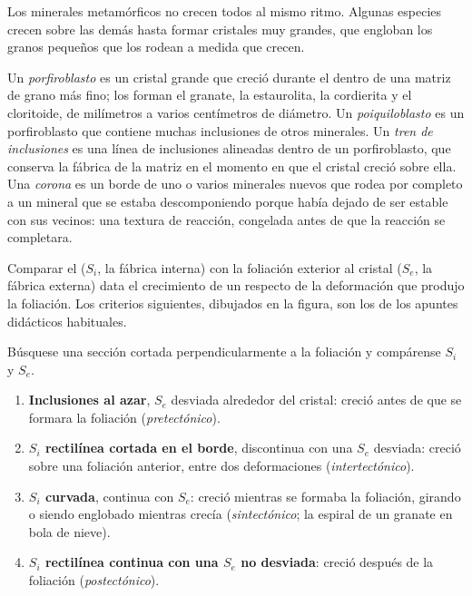 Los minerales metamórficos no crecen todos al mismo ritmo. Algunas especies crecen sobre las demás hasta formar cristales muy grandes,
que engloban los granos pequeños que los rodean a medida que crecen.

\begin{definition}\label{def:b2:field-lab-methods-2:porphyroblast}
Un \emph{porfiroblasto} es un cristal grande que creció durante el 
dentro de una matriz de grano más fino; los forman el granate, la estaurolita, la cordierita y el cloritoide, de
milímetros a varios centímetros de diámetro. Un \emph{poiquiloblasto} es un
porfiroblasto que contiene muchas inclusiones de otros minerales. Un \emph{tren de
inclusiones} es una línea de inclusiones alineadas dentro de un porfiroblasto, que
conserva la fábrica de la matriz en el momento en que el cristal creció sobre ella. Una
\emph{corona} es un borde de uno o varios minerales nuevos que rodea por completo
a un mineral que se estaba descomponiendo porque había dejado de ser estable con sus
vecinos: una textura de reacción, congelada antes de que la reacción se completara.
\end{definition}

Comparar el  ($S_i$, la fábrica interna) con la foliación exterior al cristal
($S_e$, la fábrica externa) data el crecimiento de un  respecto de la deformación que
produjo la foliación. Los criterios siguientes, dibujados en la figura, son los de los apuntes didácticos habituales.

\begin{method}\label{met:b2:field-lab-methods-2:timing}
Búsquese una sección cortada perpendicularmente a la foliación y compárense $S_i$ y $S_e$.
\begin{enumerate}
  \item \textbf{Inclusiones al azar}, $S_e$ desviada alrededor del cristal: creció antes de que se
        formara la foliación (\emph{pretectónico}).
  \item \textbf{$S_i$ rectilínea cortada en el borde}, discontinua con una $S_e$ desviada: creció
        sobre una foliación anterior, entre dos deformaciones (\emph{intertectónico}).
  \item \textbf{$S_i$ curvada}, continua con $S_e$: creció mientras se formaba la foliación, girando
        o siendo englobado mientras crecía (\emph{sintectónico}; la espiral de un granate en bola de nieve).
  \item \textbf{$S_i$ rectilínea continua con una $S_e$ no desviada}: creció después de la foliación
        (\emph{postectónico}).
\end{enumerate}
\end{method}

